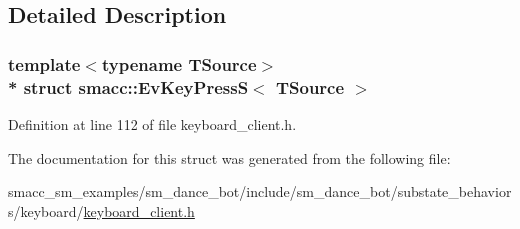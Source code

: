 \subsection{Detailed Description}
\subsubsection*{template$<$typename T\+Source$>$\\*
struct smacc\+::\+Ev\+Key\+Press\+S$<$ T\+Source $>$}



Definition at line 112 of file keyboard\+\_\+client.\+h.



The documentation for this struct was generated from the following file\+:\begin{DoxyCompactItemize}
\item 
smacc\+\_\+sm\+\_\+examples/sm\+\_\+dance\+\_\+bot/include/sm\+\_\+dance\+\_\+bot/substate\+\_\+behaviors/keyboard/\hyperlink{keyboard__client_8h}{keyboard\+\_\+client.\+h}\end{DoxyCompactItemize}
